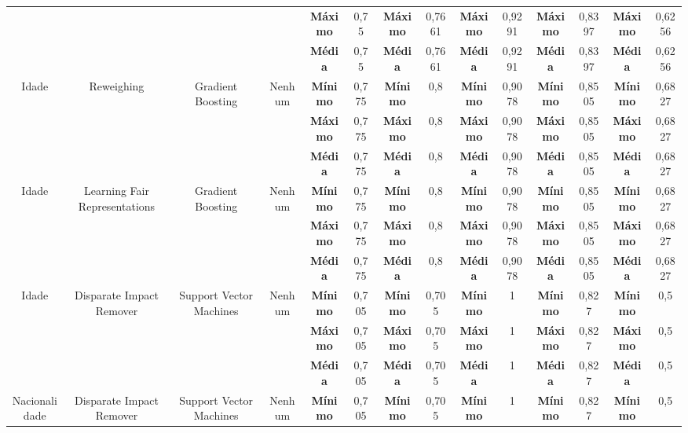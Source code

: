 \documentclass[Portugues,Final]{ic-tese-v3}
\begin{document}
\begin{table}[H]
\begin{center}
{\begin{tabular}{c|c|c|c|c|c|c|c|c|c|c|c|c|c}
             & & & & \textbf{Máximo} & 0,75 & \textbf{Máximo} & 0,7661 & \textbf{Máximo} & 0,9291 & \textbf{Máximo} & 0,8397 & \textbf{Máximo} & 0,6256 \\
             & & & & \textbf{Média} & 0,75 & \textbf{Média} & 0,7661 & \textbf{Média} & 0,9291 & \textbf{Média} & 0,8397 & \textbf{Média} & 0,6256 \\
            \hline
            \multirow{3}{*}{Idade} & \multirow{3}{*}{Reweighing} & \multirow{3}{*}{Gradient Boosting} & \multirow{3}{*}{Nenhum} & \textbf{Mínimo} & 0,775 & \textbf{Mínimo} & 0,8 & \textbf{Mínimo} & 0,9078 & \textbf{Mínimo} & 0,8505 & \textbf{Mínimo} & 0,6827 \\
             & & & & \textbf{Máximo} & 0,775 & \textbf{Máximo} & 0,8 & \textbf{Máximo} & 0,9078 & \textbf{Máximo} & 0,8505 & \textbf{Máximo} & 0,6827 \\
             & & & & \textbf{Média} & 0,775 & \textbf{Média} & 0,8 & \textbf{Média} & 0,9078 & \textbf{Média} & 0,8505 & \textbf{Média} & 0,6827 \\
            \hline
            \multirow{3}{*}{Idade} & \multirow{3}{*}{Learning Fair Representations} & \multirow{3}{*}{Gradient Boosting} & \multirow{3}{*}{Nenhum} & \textbf{Mínimo} & 0,775 & \textbf{Mínimo} & 0,8 & \textbf{Mínimo} & 0,9078 & \textbf{Mínimo} & 0,8505 & \textbf{Mínimo} & 0,6827 \\
             & & & & \textbf{Máximo} & 0,775 & \textbf{Máximo} & 0,8 & \textbf{Máximo} & 0,9078 & \textbf{Máximo} & 0,8505 & \textbf{Máximo} & 0,6827 \\
             & & & & \textbf{Média} & 0,775 & \textbf{Média} & 0,8 & \textbf{Média} & 0,9078 & \textbf{Média} & 0,8505 & \textbf{Média} & 0,6827 \\
            \hline
            \multirow{3}{*}{Idade} & \multirow{3}{*}{Disparate Impact Remover} & \multirow{3}{*}{Support Vector Machines} & \multirow{3}{*}{Nenhum} & \textbf{Mínimo} & 0,705 & \textbf{Mínimo} & 0,705 & \textbf{Mínimo} & 1 & \textbf{Mínimo} & 0,827 & \textbf{Mínimo} & 0,5 \\
             & & & & \textbf{Máximo} & 0,705 & \textbf{Máximo} & 0,705 & \textbf{Máximo} & 1 & \textbf{Máximo} & 0,827 & \textbf{Máximo} & 0,5 \\
             & & & & \textbf{Média} & 0,705 & \textbf{Média} & 0,705 & \textbf{Média} & 1 & \textbf{Média} & 0,827 & \textbf{Média} & 0,5 \\
            \hline
            \multirow{3}{*}{Nacionalidade} & \multirow{3}{*}{Disparate Impact Remover} & \multirow{3}{*}{Support Vector Machines} & \multirow{3}{*}{Nenhum} & \textbf{Mínimo} & 0,705 & \textbf{Mínimo} & 0,705 & \textbf{Mínimo} & 1 & \textbf{Mínimo} & 0,827 & \textbf{Mínimo} & 0,5 \\

\end{tabular}}
\end{center}
\end{table}
\end{document}
